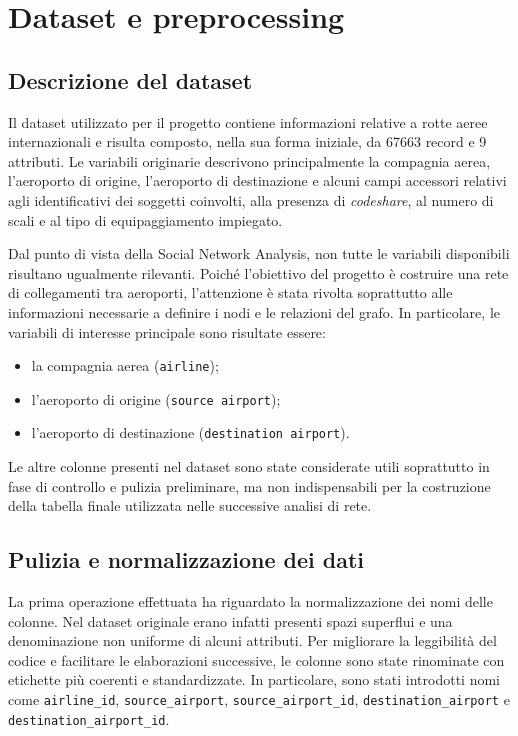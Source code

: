 \chapter{Dataset e preprocessing}

\section{Descrizione del dataset}

Il dataset utilizzato per il progetto contiene informazioni relative a rotte aeree internazionali e risulta composto, nella sua forma iniziale, da 67663 record e 9 attributi. Le variabili originarie descrivono principalmente la compagnia aerea, l’aeroporto di origine, l’aeroporto di destinazione e alcuni campi accessori relativi agli identificativi dei soggetti coinvolti, alla presenza di \textit{codeshare}, al numero di scali e al tipo di equipaggiamento impiegato.

Dal punto di vista della Social Network Analysis, non tutte le variabili disponibili risultano ugualmente rilevanti. Poiché l’obiettivo del progetto è costruire una rete di collegamenti tra aeroporti, l’attenzione è stata rivolta soprattutto alle informazioni necessarie a definire i nodi e le relazioni del grafo. In particolare, le variabili di interesse principale sono risultate essere:
\begin{itemize}
    \item la compagnia aerea (\texttt{airline});
    \item l’aeroporto di origine (\texttt{source airport});
    \item l’aeroporto di destinazione (\texttt{destination airport}).
\end{itemize}

Le altre colonne presenti nel dataset sono state considerate utili soprattutto in fase di controllo e pulizia preliminare, ma non indispensabili per la costruzione della tabella finale utilizzata nelle successive analisi di rete.

\section{Pulizia e normalizzazione dei dati}

La prima operazione effettuata ha riguardato la normalizzazione dei nomi delle colonne. Nel dataset originale erano infatti presenti spazi superflui e una denominazione non uniforme di alcuni attributi. Per migliorare la leggibilità del codice e facilitare le elaborazioni successive, le colonne sono state rinominate con etichette più coerenti e standardizzate. In particolare, sono stati introdotti nomi come \texttt{airline\_id}, \texttt{source\_airport}, \texttt{source\_airport\_id}, \texttt{destination\_airport} e \texttt{destination\_airport\_id}.

